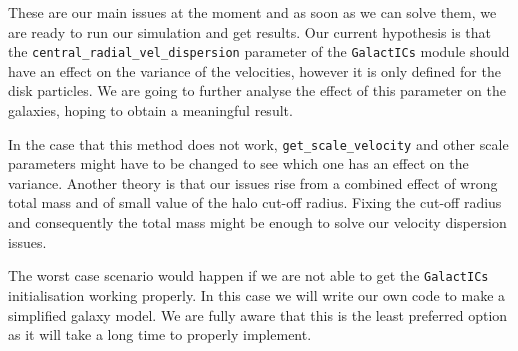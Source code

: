 \documentclass[a4paper,12pt, english]{article}
\begin{document}
\smallskip
These are our main issues at the moment and as soon as we can solve them, we are ready to run our simulation and get results. Our current hypothesis is that the \texttt{central\_radial\_vel\_dispersion} parameter of the \texttt{GalactICs} module should have an effect on the variance of the velocities, however it is only defined for the disk particles. We are going to further analyse the effect of this parameter on the galaxies, hoping to obtain a meaningful result.\par
\smallskip
In the case that this method does not work, \texttt{get\_scale\_velocity} and other scale parameters might have to be changed to see which one has an effect on the variance. Another theory is that our issues rise from a combined effect of wrong total mass and of small value of the halo cut-off radius. Fixing the cut-off radius and consequently the total mass might be enough to solve our velocity dispersion issues.\par
\smallskip
The worst case scenario would happen if we are not able to get the \texttt{GalactICs} initialisation working properly. In this case we will write our own code to make a simplified galaxy model. We are fully aware that this is the least preferred option as it will take a long time to properly implement.\par
\end{document}
